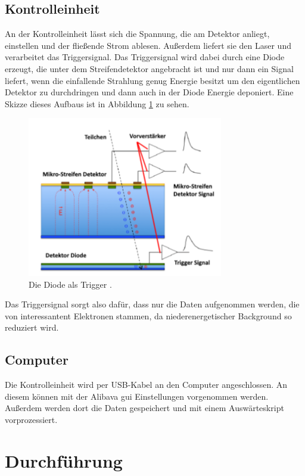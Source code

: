 \subsection{Kontrolleinheit}
An der Kontrolleinheit lässt sich die Spannung, die am Detektor anliegt, einstellen und der fließende Strom ablesen. Außerdem liefert sie den Laser und verarbeitet das Triggersignal. Das Triggersignal wird dabei durch eine Diode erzeugt, die unter dem Streifendetektor angebracht ist und nur dann ein Signal liefert, wenn die einfallende Strahlung genug Energie besitzt um den eigentlichen Detektor zu durchdringen und dann auch in der Diode Energie deponiert. Eine Skizze dieses Aufbaus ist in Abbildung \ref{fig:diodenTrigger} zu sehen.
\begin{figure}
  \centering
  \includegraphics[height=7cm]{TimosAufrisse/diodenTrigger.png}
  \caption{Die Diode als Trigger \cite{anleitung}.}
  \label{fig:diodenTrigger}
\end{figure}
Das Triggersignal sorgt also dafür, dass nur die Daten aufgenommen werden, die von interessantent Elektronen stammen, da niederenergetischer Background so reduziert wird.

\subsection{Computer}
Die Kontrolleinheit wird per USB-Kabel an den Computer angeschlossen. An diesem können mit der Alibava gui Einstellungen vorgenommen werden. Außerdem werden dort die Daten gespeichert und mit einem Auswärteskript vorprozessiert.




 \section{Durchführung}
\label{sec:Durchführung}

